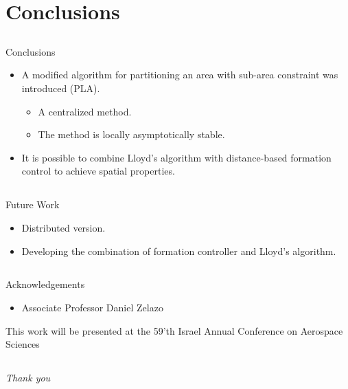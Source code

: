 \documentclass[t]{beamer}
\begin{document}
\section[Conclusions]{Conclusions}
\subsection[Conclusions]{}
\begin{frame}[label=conclusions]{Conclusions}
\begin{itemize}
\item A modified algorithm for partitioning an area with sub-area constraint was introduced (PLA).
\begin{itemize}
\item A centralized method.
\item The method is locally asymptotically stable.
\end{itemize}
\item It is possible to combine Lloyd's algorithm with distance-based formation control to achieve spatial properties.
\end{itemize}
\end{frame}
\subsection[Future Work]{}
\begin{frame}[label=futurework]{Future Work}
\begin{itemize}
\item Distributed version.
\item Developing the combination of formation controller and Lloyd's algorithm.
\end{itemize}
\end{frame}
\subsection[Acknowledgements]{}
\begin{frame}[label=acknowledgements]{Acknowledgements}
\begin{itemize}
\item Associate Professor Daniel Zelazo
\end{itemize} \pause
This work will be presented at the 59'th Israel Annual Conference on Aerospace Sciences
\end{frame}
\subsection[Thank you]{}
\begin{frame}{}
  \centering \Large
  \emph{Thank you}
\end{frame}
\end{document}
